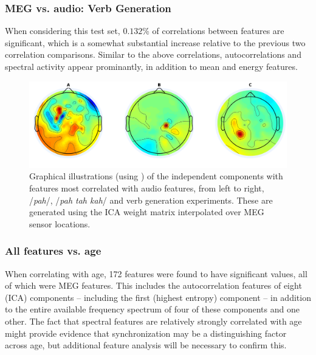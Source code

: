 \documentclass[utf8]{frontiersSCNS} %
\begin{document}

\subsubsection{MEG vs. audio: Verb Generation}

When considering this test set, $0.132$\% of correlations between features are significant, which is a somewhat substantial increase relative to the previous two correlation comparisons. Similar to the above correlations, autocorrelations and spectral activity appear prominantly, in addition to mean and energy features. 

\begin{figure}[t]
  \centering
  \includegraphics[width=\linewidth]{AllComponents.png}
  \caption{Graphical illustrations (using \cite{Delorme04eeglab}) of the independent components with features most correlated with audio features, from left to right, /{\em pah}/, /{\em pah tah kah}/ and verb generation experiments. These are generated using the ICA weight matrix interpolated over MEG sensor locations. }
  \label{fig:components}
\end{figure}
 
\subsubsection{All features vs. age}

When correlating with age, 172 features were found to have significant values, all of which were MEG features. This includes the autocorrelation features of eight (ICA) components -- including the first (highest entropy) component -- in addition to the entire available frequency spectrum of four of these components and one other. The fact that spectral features are relatively strongly correlated with age might provide evidence that synchronization may be a distinguishing factor across age, but additional feature analysis will be necessary to confirm this.
\end{document}
